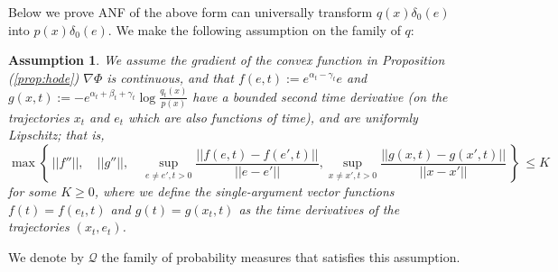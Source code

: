 \documentclass{article}
\def\gQ{{\mathcal{Q}}}
\newtheorem{assumption}{Assumption}
\begin{document}
Below we prove ANF of the above form can universally transform $q(x)\delta_0(e)$ into $p(x)\delta_0(e)$. 
We make the following assumption on the family of $q$:
\begin{assumption}
\label{assumption}
We assume the gradient of the convex function in Proposition (\ref{prop:hode}) $\nabla\Phi$ is continuous, and that
$f(e,t):=e^{\alpha_t-\gamma_t}e$ and 
$g(x,t):=-e^{\alpha_t+\beta_t+\gamma_t}\log\frac{q_t(x)}{p(x)}$ have a bounded second time derivative (on the trajectories $x_t$ and $e_t$ which are also functions of time), and are uniformly Lipschitz; that is,
$$\max\left\{\,
||f''||, \quad
||g''||, \quad
\sup_{e\neq e', t>0}\frac{||f(e, t) - f(e', t)||}{||e-e'||}, 
\sup_{x\neq x', t>0}\frac{||g(x, t) - g(x', t)||}{||x-x'||}
\,\right\}\, \leq K$$
for some $K\geq 0$, where we define the single-argument vector functions $f(t)=f(e_t,t)$ and $g(t)=g(x_t,t)$ as the time derivatives of the trajectories $(x_t,e_t)$. 
\end{assumption}

We denote by $\gQ$ the family of probability measures that satisfies this assumption. 
\end{document}
